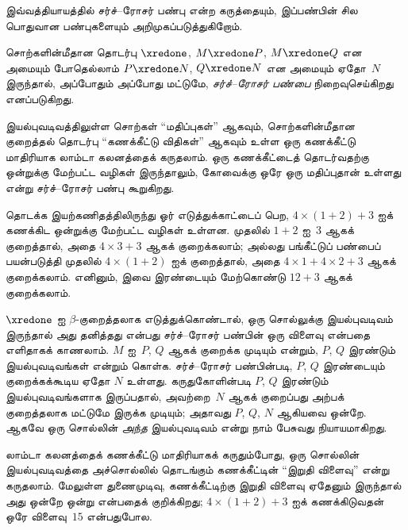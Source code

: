 \documentclass[../../../include/open-logic-section]{subfiles}
\begin{document}


இவ்வத்தியாயத்தில் சர்ச்--ரோசர் பண்பு என்ற கருத்தையும், இப்பண்பின் சில பொதுவான
பண்புகளையும் அறிமுகப்படுத்துகிறோம்.

\begin{defn}[சர்ச்--ரோசர் பண்பு, CR] சொற்களின்மீதான தொடர்பு $\xredone$,
  $M \xredone P$, $M \xredone Q$ என அமையும் போதெல்லாம்
  $P \xredone N$, $Q \xredone N$ என அமையும் ஏதோ~$N$ இருந்தால், அப்போதும்
  அப்போது மட்டுமே, \emph{சர்ச்--ரோசர் பண்பை} நிறைவுசெய்கிறது எனப்படுகிறது.
\end{defn}

இயல்புவடிவத்திலுள்ள சொற்கள் “மதிப்புகள்” ஆகவும், சொற்களின்மீதான குறைத்தல்
தொடர்பு “கணக்கீட்டு விதிகள்” ஆகவும் உள்ள ஒரு கணக்கீட்டு மாதிரியாக லாம்டா
கலனத்தைக் கருதலாம். ஒரு கணக்கீட்டைத் தொடர்வதற்கு ஒன்றுக்கு மேற்பட்ட வழிகள்
இருந்தாலும், கோவைக்கு ஒரே ஒரு மதிப்புதான் உள்ளது என்று சர்ச்--ரோசர் பண்பு
கூறுகிறது.

தொடக்க இயற்கணிதத்திலிருந்து ஓர் எடுத்துக்காட்டைப் பெற, $4 \times (1+2) + 3$
ஐக் கணக்கிட ஒன்றுக்கு மேற்பட்ட வழிகள் உள்ளன. முதலில் $1+2$ ஐ~$3$ ஆகக்
குறைத்தால், அதை $4 \times 3+3$ ஆகக் குறைக்கலாம்; அல்லது பங்கீட்டுப் பண்பைப்
பயன்படுத்தி முதலில் $4 \times (1+2)$ ஐக் குறைத்தால், அதை
$4 \times 1+4 \times 2+3$ ஆகக் குறைக்கலாம். எனினும், இவை இரண்டையும்
மேற்கொண்டு $12+3$ ஆகக் குறைக்கலாம்.

$\xredone$ ஐ $\beta$-குறைத்தலாக எடுத்துக்கொண்டால், ஒரு சொல்லுக்கு
இயல்புவடிவம் இருந்தால் அது தனித்தது என்பது சர்ச்--ரோசர் பண்பின் ஒரு விளைவு
என்பதை எளிதாகக் காணலாம். $M$ ஐ~$P$, $Q$ ஆகக் குறைக்க முடியும் என்றும்,
$P$, $Q$ இரண்டும் இயல்புவடிவங்கள் என்றும் கொள்க. சர்ச்--ரோசர் பண்பின்படி, $P$, $Q$
இரண்டையும் குறைக்கக்கூடிய ஏதோ $N$ உள்ளது. கருதுகோளின்படி $P$, $Q$ இரண்டும்
இயல்புவடிவங்களாக இருப்பதால், அவற்றை~$N$ ஆகக் குறைப்பது அற்பக் குறைத்தலாக
மட்டுமே இருக்க முடியும்; அதாவது $P$, $Q$, $N$ ஆகியவை ஒன்றே. ஆகவே ஒரு
சொல்லின் \emph{அந்த} இயல்புவடிவம் என்று நாம் பேசுவது நியாயமாகிறது.

லாம்டா கலனத்தைக் கணக்கீட்டு மாதிரியாகக் கருதும்போது, ஒரு சொல்லின் இயல்புவடிவத்தை
அச்சொல்லில் தொடங்கும் கணக்கீட்டின் “இறுதி விளைவு” என்று கருதலாம். மேலுள்ள
துணைமுடிவு, கணக்கீட்டிற்கு இறுதி விளைவு ஏதேனும் இருந்தால் அது ஒன்றே ஒன்று
என்பதைக் குறிக்கிறது; $4 \times (1+2)+3$ ஐக் கணக்கிடுவதன் ஒரே விளைவு~$15$
என்பதுபோல.
\end{document}
